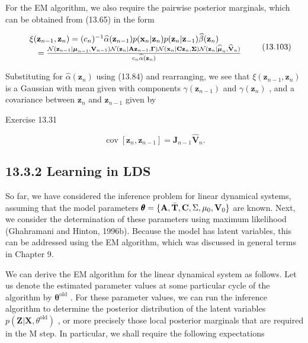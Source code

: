 \documentclass[
  10
]{article}
\begin{document}
For the EM algorithm, we also require the pairwise posterior marginals,
which can be obtained from (13.65) in the form

\[
\begin{array}{r l} & {\xi (\mathbf {z} _ {n - 1}, \mathbf {z} _ {n}) = (c _ {n}) ^ {- 1} \widehat {\alpha} (\mathbf {z} _ {n - 1}) p (\mathbf {x} _ {n} | \mathbf {z} _ {n}) p (\mathbf {z} _ {n} | \mathbf {z} _ {- 1}) \widehat {\beta} (\mathbf {z} _ {n})} \\ & {\quad = \frac {\mathcal {N} (\mathbf {z} _ {n - 1} | \boldsymbol {\mu} _ {n - 1} , \mathbf {V} _ {n - 1}) \mathcal {N} (\mathbf {z} _ {n} | \mathbf {A z} _ {n - 1} , \boldsymbol {\Gamma}) \mathcal {N} (\mathbf {x} _ {n} | \mathbf {C z} _ {n} , \boldsymbol {\Sigma}) \mathcal {N} (\mathbf {z} _ {n} | \widehat {\boldsymbol {\mu}} _ {n} , \widehat {\mathbf {V}} _ {n})}{c _ {n} \widehat {\alpha} (\mathbf {z} _ {n})}} \end{array}\tag{13.103}
\]

Substituting for \(\widehat { \alpha } ( \mathbf { z } _ { n } )\) using
(13.84) and rearranging, we see that
\(\xi ( \mathbf { z } _ { n - 1 } , \mathbf { z } _ { n } )\) is a
Gaussian with mean given with components
\(\gamma ( \mathbf { z } _ { n - 1 } )\) and
\(\gamma ( \mathbf { z } _ { n } )\) , and a covariance between
\(\mathbf { z } _ { n }\) and \(\mathbf { z } _ { n - 1 }\) given by

Exercise 13.31

\[
\operatorname{cov} \left[ \mathbf {z} _ {n}, \mathbf {z} _ {n - 1} \right] = \mathbf {J} _ {n - 1} \widehat {\mathbf {V}} _ {n}.\tag{13.104}
\]

\subsection{13.3.2 Learning in LDS}\label{learning-in-lds}

So far, we have considered the inference problem for linear dynamical
systems, assuming that the model parameters
\(\pmb \theta = \{ { \bf A } , \bar { \bf T } , { \bf C } , \Sigma , \mu _ { 0 } , { \bf V } _ { 0 } \}\)
are known. Next, we consider the determination of these parameters using
maximum likelihood (Ghahramani and Hinton, 1996b). Because the model has
latent variables, this can be addressed using the EM algorithm, which
was discussed in general terms in Chapter 9.

We can derive the EM algorithm for the linear dynamical system as
follows. Let us denote the estimated parameter values at some particular
cycle of the algorithm by \(\pmb { \theta } ^ { \mathrm { o l d } }\) .
For these parameter values, we can run the inference algorithm to
determine the posterior distribution of the latent variables
\(p ( \mathbf { Z } | \mathbf { X } , \theta ^ { \mathrm { o l d } } )\)
, or more precisely those local posterior marginals that are required in
the M step. In particular, we shall require the following expectations
\end{document}
